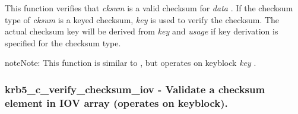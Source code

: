 \documentclass[letterpaper,10pt,english]{sphinxmanual}
\begin{document}
This function verifies that \emph{cksum} is a valid checksum for \emph{data} . If the checksum type of \emph{cksum} is a keyed checksum, \emph{key} is used to verify the checksum. The actual checksum key will be derived from \emph{key} and \emph{usage} if key derivation is specified for the checksum type.

\begin{notice}{note}{Note:}
This function is similar to {\hyperref[appdev/refs/api/krb5_k_verify_checksum:c.krb5_k_verify_checksum]{}} , but operates on keyblock \emph{key} .
\end{notice}


\subsubsection{krb5\_c\_verify\_checksum\_iov -  Validate a checksum element in IOV array (operates on keyblock).}
\label{appdev/refs/api/krb5_c_verify_checksum_iov::doc}\label{appdev/refs/api/krb5_c_verify_checksum_iov:krb5-c-verify-checksum-iov-validate-a-checksum-element-in-iov-array-operates-on-keyblock}

\begin{fulllineitems}
\label{appdev/refs/api/krb5_c_verify_checksum_iov:c.krb5_c_verify_checksum_iov}
\end{fulllineitems}
\end{document}
